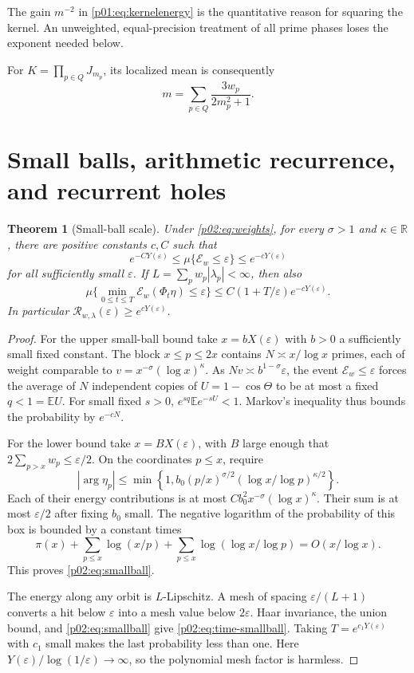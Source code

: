 \documentclass[11pt,letterpaper]{article}
\newtheorem{theorem}{Theorem}[section]
\theoremstyle{definition}
\theoremstyle{remark}
\newcommand{\R}{\mathbb R}
\newcommand{\eps}{\varepsilon}
\newcommand{\1}{\mathbf 1}
\begin{document}
The gain $m^{-2}$ in \eqref{p01:eq:kernelenergy} is the quantitative reason
for squaring the kernel. An unweighted, equal-precision treatment of all
prime phases loses the exponent needed below.

For $K=\prod_{p\in Q}J_{m_p}$, its localized mean is consequently
\begin{equation}\label{p02:eq:kernel-mean}
 m=\sum_{p\in Q}\frac{3w_p}{2m_p^2+1}.
\end{equation}

\section{Small balls, arithmetic recurrence, and recurrent holes}
\label{p02:sec:recurrence}

\begin{theorem}[Small-ball scale]\label{p02:thm:smallball}
Under \eqref{p02:eq:weights}, for every $\sigma>1$ and $\kappa\in\R$,
there are positive constants $c,C$ such that
\begin{equation}\label{p02:eq:smallball}
 e^{-CY(\eps)}\le\mu\{\mathcal E_w\le\eps\}
 \le e^{-cY(\eps)}
\end{equation}
for all sufficiently small $\eps$.
If $L=\sum_p w_p|\lambda_p|<\infty$, then also
\begin{equation}\label{p02:eq:time-smallball}
 \mu\{\min_{0\le t\le T}\mathcal E_w(\Phi_t\eta)\le\eps\}
 \le C(1+T/\eps)e^{-cY(\eps)}.
\end{equation}
In particular $\mathcal R_{w,\lambda}(\eps)\ge e^{cY(\eps)}$.
\end{theorem}
\begin{proof}
For the upper small-ball bound take $x=bX(\eps)$ with $b>0$ a
sufficiently small fixed constant. The block $x\le p\le2x$ contains
$N\asymp x/\log x$ primes, each of weight comparable to
$v=x^{-\sigma}(\log x)^\kappa$. As $Nv\asymp
b^{1-\sigma}\eps$, the event $\mathcal E_w\le\eps$ forces the
average of $N$ independent copies of $U=1-\cos\Theta$ to be at most
a fixed $q<1=\mathbb E U$. For small fixed $s>0$,
$e^{sq}\mathbb E e^{-sU}<1$. Markov's inequality thus bounds the
probability by $e^{-cN}$.

For the lower bound take $x=BX(\eps)$, with $B$ large enough that
$2\sum_{p>x}w_p\le\eps/2$. On the coordinates $p\le x$, require
\[
 |\arg\eta_p|\le
 \min\left\{1,b_0(p/x)^{\sigma/2}
                   (\log x/\log p)^{\kappa/2}\right\}.
\]
Each of their energy contributions is at most
$C b_0^2x^{-\sigma}(\log x)^\kappa$. Their sum is at most
$\eps/2$ after fixing $b_0$ small. The negative logarithm of the
probability of this box is bounded by a constant times
\[
 \pi(x)+\sum_{p\le x}\log(x/p)
             +\sum_{p\le x}\log(\log x/\log p)=O(x/\log x).
\]
This proves \eqref{p02:eq:smallball}.

The energy along any orbit is $L$-Lipschitz. A mesh of spacing
$\eps/(L+1)$ converts a hit below $\eps$ into a mesh value below
$2\eps$. Haar invariance, the union bound, and
\eqref{p02:eq:smallball} give \eqref{p02:eq:time-smallball}. Taking
$T=e^{c_1Y(\eps)}$ with $c_1$ small makes the last probability less
than one. Here $Y(\eps)/\log(1/\eps)\to\infty$, so the polynomial
mesh factor is harmless.
\end{proof}
\end{document}
